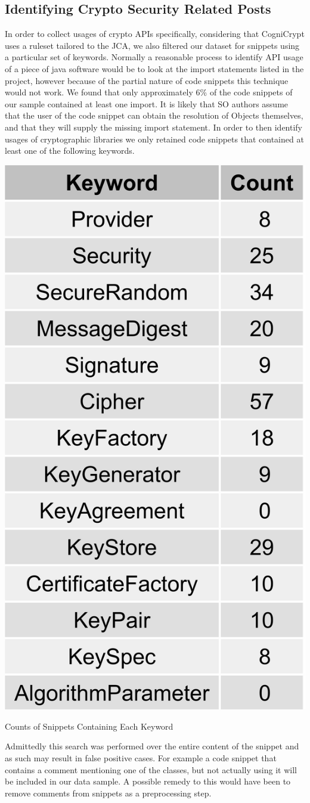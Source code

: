 \documentclass[10pt, conference]{IEEEtran}
\begin{document}
\subsection{Identifying Crypto Security Related Posts}
In order to collect usages of crypto APIs specifically, considering that CogniCrypt uses a ruleset tailored to the JCA, we also filtered our dataset for snippets using a particular set of keywords. 
Normally a reasonable process to identify API usage of a piece of java software would be to look at the import statements listed in the project, however because of the partial nature of code snippets this technique would not work. We found that only approximately 6\% of the code snippets of our sample contained at least one import. It is likely that SO authors assume that the user of the code snippet can obtain the resolution of Objects themselves, and that they will supply the missing import statement.
In order to then identify usages of cryptographic libraries we only retained code snippets that contained at least one of the following keywords.

\begin{table}[h]
\begin{center}
\includegraphics[width=0.5\linewidth]{KeywordCounts.png}
\caption{Counts of Snippets Containing Each Keyword}
\end{center}
\end{table}

Admittedly this search was performed over the entire content of the snippet and as such may result in false positive cases. For example a code snippet that contains a comment mentioning one of the classes, but not actually using it will be included in our data sample. A possible remedy to this would have been to remove comments from snippets as a preprocessing step. 
\end{document}
